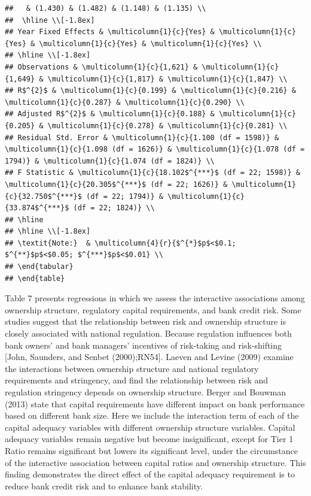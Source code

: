 \documentclass{article}
\begin{document}
\begin{verbatim}
##   & (1.430) & (1.482) & (1.148) & (1.135) \\ 
##  \hline \\[-1.8ex] 
## Year Fixed Effects & \multicolumn{1}{c}{Yes} & \multicolumn{1}{c}{Yes} & \multicolumn{1}{c}{Yes} & \multicolumn{1}{c}{Yes} \\ 
## \hline \\[-1.8ex] 
## Observations & \multicolumn{1}{c}{1,621} & \multicolumn{1}{c}{1,649} & \multicolumn{1}{c}{1,817} & \multicolumn{1}{c}{1,847} \\ 
## R$^{2}$ & \multicolumn{1}{c}{0.199} & \multicolumn{1}{c}{0.216} & \multicolumn{1}{c}{0.287} & \multicolumn{1}{c}{0.290} \\ 
## Adjusted R$^{2}$ & \multicolumn{1}{c}{0.188} & \multicolumn{1}{c}{0.205} & \multicolumn{1}{c}{0.278} & \multicolumn{1}{c}{0.281} \\ 
## Residual Std. Error & \multicolumn{1}{c}{1.100 (df = 1598)} & \multicolumn{1}{c}{1.098 (df = 1626)} & \multicolumn{1}{c}{1.078 (df = 1794)} & \multicolumn{1}{c}{1.074 (df = 1824)} \\ 
## F Statistic & \multicolumn{1}{c}{18.102$^{***}$ (df = 22; 1598)} & \multicolumn{1}{c}{20.305$^{***}$ (df = 22; 1626)} & \multicolumn{1}{c}{32.750$^{***}$ (df = 22; 1794)} & \multicolumn{1}{c}{33.874$^{***}$ (df = 22; 1824)} \\ 
## \hline 
## \hline \\[-1.8ex] 
## \textit{Note:}  & \multicolumn{4}{r}{$^{*}$p$<$0.1; $^{**}$p$<$0.05; $^{***}$p$<$0.01} \\ 
## \end{tabular} 
## \end{table}
\end{verbatim}

Table 7 presents regressions in which we assess the interactive
associations among ownership structure, regulatory capital requirements,
and bank credit risk. Some studies suggest that the relationship between
risk and ownership structure is closely associated with national
regulation. Because regulation influences both bank owners' and bank
managers' incentives of risk-taking and risk-shifting {[}John, Saunders,
and Senbet (2000);RN54{]}. Laeven and Levine (2009) examine the
interactions between ownership structure and national regulatory
requirements and stringency, and find the relationship between risk and
regulation stringency depends on ownership structure. Berger and Bouwman
(2013) state that capital requirements have different impact on bank
performance based on different bank size. Here we include the
interaction term of each of the capital adequacy variables with
different ownership structure variables. Capital adequacy variables
remain negative but become insignificant, except for Tier 1 Ratio
remains significant but lowers its significant level, under the
circumstance of the interactive association between capital ratios and
ownership structure. This finding demonstrates the direct effect of the
capital adequacy requirement is to reduce bank credit risk and to
enhance bank stability.
\end{document}
